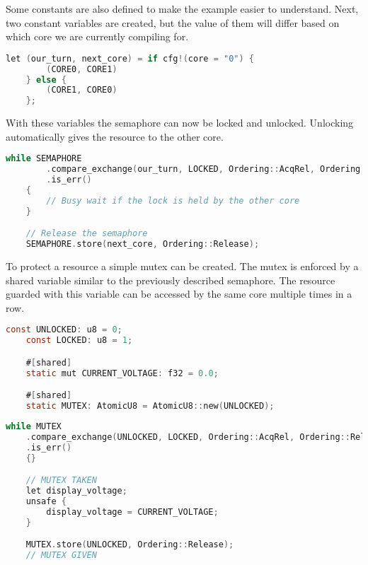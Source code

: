 Some constants are also defined to make the example easier to understand. Next, two constant variables are created, but the value of them will differ based on which core we are currently compiling for.

\begin{lstlisting}[language=C,frame=single,float=!ht,label={lst:sw-semaphore2},caption={Software Semaphore Core Specific Variables}]
    let (our_turn, next_core) = if cfg!(core = "0") {
        (CORE0, CORE1)
    } else {
        (CORE1, CORE0)
    };
\end{lstlisting}

With these variables the semaphore can now be locked and unlocked. Unlocking automatically gives the resource to the other core.

\begin{lstlisting}[language=C,frame=single,float=!ht,label={lst:sw-semaphore3},caption={Software Semaphore Locking and Unlocking}]
    while SEMAPHORE
        .compare_exchange(our_turn, LOCKED, Ordering::AcqRel, Ordering::Relaxed)
        .is_err()
    {
        // Busy wait if the lock is held by the other core
    }

    // Release the semaphore
    SEMAPHORE.store(next_core, Ordering::Release);
\end{lstlisting}

To protect a resource a simple mutex can be created. The mutex is enforced by a shared variable similar to the previously described semaphore. The resource guarded with this variable can be accessed by the same core multiple times in a row.

\begin{lstlisting}[language=C,frame=single,float=!ht,label={lst:sw-mutex1},caption={Mutex For a Variable}]
    const UNLOCKED: u8 = 0;
    const LOCKED: u8 = 1;

    #[shared]
    static mut CURRENT_VOLTAGE: f32 = 0.0;

    #[shared]
    static MUTEX: AtomicU8 = AtomicU8::new(UNLOCKED);
\end{lstlisting}

\begin{lstlisting}[language=C,frame=single,float=!ht,label={lst:sw-mutex2},caption={Performing a Read Operation Using a Mutex}]
    while MUTEX
    .compare_exchange(UNLOCKED, LOCKED, Ordering::AcqRel, Ordering::Relaxed)
    .is_err()
    {}

    // MUTEX TAKEN
    let display_voltage;
    unsafe {
        display_voltage = CURRENT_VOLTAGE;
    }

    MUTEX.store(UNLOCKED, Ordering::Release);
    // MUTEX GIVEN
\end{lstlisting}

